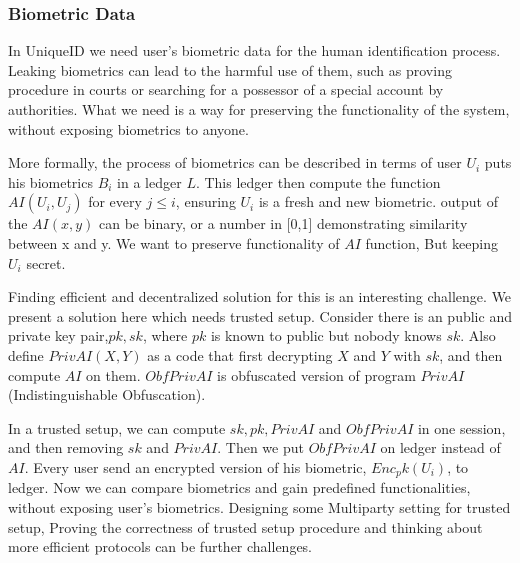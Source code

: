 \documentclass[conference]{IEEEtran}
\begin{document}
\subsubsection*{Biometric Data}
In UniqueID we need user's biometric data for the human identification process. Leaking biometrics can lead to the harmful use of them, such as proving procedure in courts or searching for a possessor of a special account by authorities. What we need is a way for preserving the functionality of the system, without exposing biometrics to anyone.


More formally, the process of biometrics can be described in terms of user $U_i$ puts his biometrics $B_i$ in a ledger $L$. This ledger then compute the function $AI(U_i,U_j)$ for every $j \leq i$, ensuring $U_i$ is a fresh and new biometric. output of the $AI(x,y)$ can be binary, or a number in [0,1] demonstrating similarity between x and y. We want to preserve functionality of $AI$ function, But keeping $U_i$ secret. 

Finding efficient and decentralized solution for this is an interesting challenge. We present a solution here which needs trusted setup. Consider there is an public and private key pair,$pk,sk$, where $pk$ is known to public but nobody knows $sk$. Also define $PrivAI(X,Y)$ as a code that first decrypting $X$ and $Y$ with $sk$, and then compute $AI$ on them. $ObfPrivAI$ is obfuscated version of program $PrivAI$ (Indistinguishable Obfuscation). 

In a trusted setup, we can compute $sk,pk,PrivAI$ and $ObfPrivAI$ in one session, and then removing $sk$ and $PrivAI$. Then we put $ObfPrivAI$ on ledger instead of $AI$. Every user send an encrypted version of his biometric, $Enc_pk(U_i)$, to ledger. Now we can compare biometrics and gain predefined functionalities, without exposing user's biometrics. Designing some Multiparty setting for trusted setup, Proving the correctness of trusted setup procedure and thinking about more efficient protocols can be further challenges. 
\end{document}

